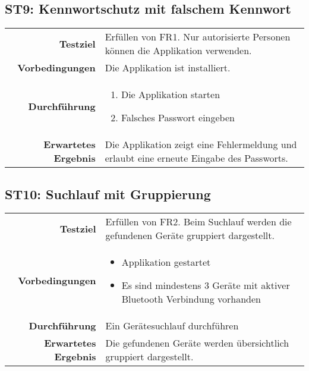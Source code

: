 \subsection{ST9: Kennwortschutz mit falschem Kennwort}
\begin{table}[H]
\begin{tabularx}{\textwidth}{r X }
\textbf{Testziel} & Erfüllen von \ac{FR}1. Nur autorisierte Personen können die Applikation verwenden.\\
\textbf{Vorbedingungen} & Die Applikation ist installiert.\\
\textbf{Durchführung} & \begin{enumerate}
\item Die Applikation starten
\item Falsches Passwort eingeben
\end{enumerate} \\
\textbf{Erwartetes Ergebnis} & Die Applikation zeigt eine Fehlermeldung und erlaubt eine erneute Eingabe des Passworts.\\
\end{tabularx}
\end{table}

\subsection{ST10: Suchlauf mit Gruppierung}
\begin{table}[H]
\begin{tabularx}{\textwidth}{r X }
\textbf{Testziel} & Erfüllen von \ac{FR}2. Beim Suchlauf werden die gefundenen Geräte gruppiert dargestellt.\\
\textbf{Vorbedingungen} & \begin{itemize}
\item Applikation gestartet
\item Es sind mindestens 3 Geräte mit aktiver Bluetooth Verbindung vorhanden
\end{itemize} \\
\textbf{Durchführung} & Ein Gerätesuchlauf durchführen\\
\textbf{Erwartetes Ergebnis} & Die gefundenen Geräte werden übersichtlich gruppiert dargestellt.\\
\end{tabularx}
\end{table}

